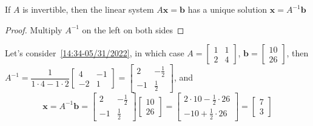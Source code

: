\documentclass{beamer}
\theoremstyle{definition}
\theoremstyle{remark}
\begin{document}
\begin{frame}[t]
\begin{theorem}
If $A$ is invertible, then the linear system $A\mathbf x=\mathbf b$ has a unique solution $\mathbf x=A^{-1}\mathbf b$
\end{theorem}
\pause
\begin{proof}
Multiply $A^{-1}$ on the left on both sides
\end{proof}
\pause
\begin{example}
Let's consider~\eqref{14:34-05/31/2022}, in which case $A=\begin{bmatrix}
1&1\\2&4
\end{bmatrix}$, $\mathbf b=\begin{bmatrix}
10\\26
\end{bmatrix}$, then $A^{-1}=\dfrac{1}{1\cdot4-1\cdot2}\begin{bmatrix}
4&-1\\-2&1
\end{bmatrix}=\begin{bmatrix}
2&-\frac{1}{2}\\-1&\frac{1}{2}
\end{bmatrix}$, and\pause
\[
\mathbf x=A^{-1}\mathbf b=\begin{bmatrix}
2&-\frac{1}{2}\\-1&\frac{1}{2}
\end{bmatrix}\begin{bmatrix}
10\\26
\end{bmatrix}=\begin{bmatrix}
2\cdot10-\frac{1}{2}\cdot26\\-10+\frac{1}{2}\cdot26
\end{bmatrix}=\begin{bmatrix}
7\\3
\end{bmatrix}
\]
\end{example}
\end{frame}
\end{document}

